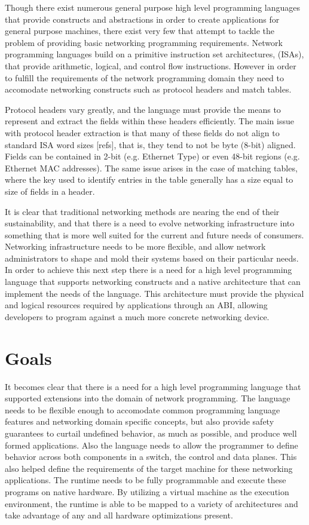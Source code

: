 Though there exist numerous general purpose high level programming languages
that provide constructs and abstractions in order to create applications for
general purpose machines, there exist very few that attempt to tackle the
problem of providing basic networking programming requirements. Network
programming languages build on a primitive instruction set architectures,
(ISAs), that provide arithmetic, logical, and control flow instructions.
However in order to fulfill the requirements of the network programming domain
they need to accomodate networking constructs such as protocol headers and
match tables.

Protocol headers vary greatly, and the language must provide the means to
represent and extract the fields within these headers efficiently. The main
issue with protocol header extraction is that many of these fields do not
align to standard ISA word sizes [refs], that is, they tend to not be byte
(8-bit) aligned. Fields can be contained in 2-bit (e.g. Ethernet Type) or even
48-bit regions (e.g. Ethernet MAC addresses). The same issue arises in the case
of matching tables, where the key used to identify entries in the table
generally has a size equal to size of fields in a header.

It is clear that traditional networking methods are nearing the end of their
sustainability, and that there is a need to evolve networking infrastructure
into something that is more well suited for the current and future needs of
consumers. Networking infrastructure needs to be more flexible, and allow
network administrators to shape and mold their systems based on their
particular needs. In order to achieve this next step there is a need for a
high level programming language that supports networking constructs and
a native architecture that can implement the needs of the language. This
architecture must provide the physical and logical resources required by
applications through an ABI, allowing developers to program against a much
more concrete networking device.

\section{Goals}
It becomes clear that there is a need for a high level programming language
that supported extensions into the domain of network programming. The language
needs to be flexible enough to accomodate common programming language features
and networking domain specific concepts, but also provide safety guarantees to
curtail undefined behavior, as much as possible, and produce well formed
applications. Also the language needs to allow the programmer to define
behavior across both components in a switch, the control and data planes. This
also helped define the requirements of the target machine for these networking
applications. The runtime needs to be fully programmable and execute these
programs on native hardware. By utilizing a virtual machine as the execution
environment, the runtime is able to be mapped to a variety of architectures
and take advantage of any and all hardware optimizations present.

